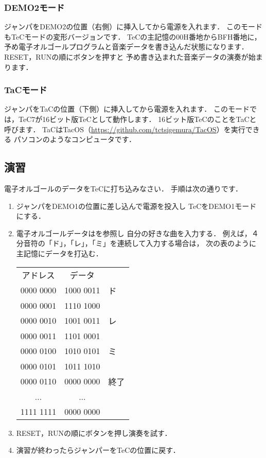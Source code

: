 \subsubsection{DEMO2モード}
ジャンパをDEMO2の位置（右側）に挿入してから電源を入れます．
このモードもTeCモードの変形バージョンです．
TeCの主記憶の00H番地からBFH番地に，
予め電子オルゴールプログラムと音楽データを書き込んだ状態になります．
RESET，RUNの順にボタンを押すと
予め書き込まれた音楽データの演奏が始まります．

\subsubsection{TaCモード}
ジャンパをTaCの位置（下側）に挿入してから電源を入れます．
このモードでは，TeC7が16ビット版TeCとして動作します．
16ビット版TeCのことをTaCと呼びます．
TaCはTacOS（\url{https://github.com/tctsigemura/TacOS}）を実行できる
パソコンのようなコンピュータです．

\subsection*{演習}

電子オルゴールのデータをTeCに打ち込みなさい．
手順は次の通りです．

\begin{enumerate}
\item ジャンパをDEMO1の位置に差し込んで電源を投入し
TeCをDEMO1モードにする．
\item 電子オルゴールデータはを参照し
自分の好きな曲を入力する．
例えば，４分音符の「ド」，「レ」，「ミ」を連続して入力する場合は，
次の表のように主記憶にデータを打込む．

{\tt\small\begin{center}
\begin{tabular}{| c | c | l }\cline{1-2}
アドレス  & データ \\\cline{1-2}
0000 0000 & 1000 0011 & ド   \\
0000 0001 & 1110 1000 &      \\
0000 0010 & 1001 0011 & レ   \\
0000 0011 & 1101 0001 &      \\
0000 0100 & 1010 0101 & ミ   \\
0000 0101 & 1011 1010 &      \\
0000 0110 & 0000 0000 & 終了 \\
  ...     &   ...     &      \\
1111 1111 & 0000 0000 &      \\\cline{1-2}
\end{tabular}
\end{center}}

\item RESET，RUNの順にボタンを押し演奏を試す．

\item 演習が終わったらジャンパーをTeCの位置に戻す．
\end{enumerate}
